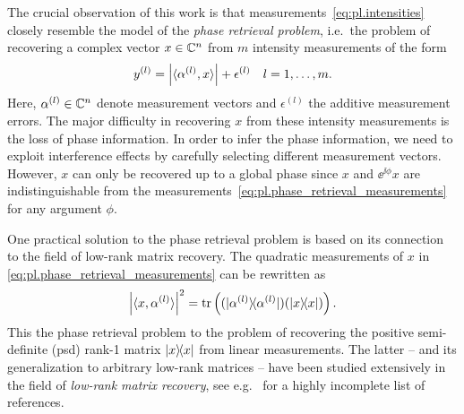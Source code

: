 The crucial observation of this work is that measurements~\eqref{eq:pl.intensities} closely resemble the model of the \textit{phase retrieval problem}, i.e.\ the problem of recovering a complex vector ${x} \in {\mathbb{C}}^n$ from $m$ intensity measurements of the form
\[
  y^{(l)}= {\left\vert\braket{\alpha^{(l)}, x}\right\vert} + \epsilon^{(l)}
  \quad l=1,\ldots,m.
  \label{eq:pl.phase_retrieval_measurements}
\]
Here, $\alpha^{(l)} \in {\mathbb{C}}^n$ denote measurement vectors and $\epsilon^{(l)}$ the additive measurement errors.
The major difficulty in recovering $x$ from these intensity measurements is the loss of phase information.
In order to infer the phase information, we need to exploit interference effects by carefully selecting different measurement vectors.
However, $x$ can only be recovered up to a global phase since $x$ and $\ee^{\ii\phi} x$ are indistinguishable from the measurements~\eqref{eq:pl.phase_retrieval_measurements} for any argument $\phi$.

One practical solution to the phase retrieval problem is based on its connection to the field of low-rank matrix recovery.
The quadratic measurements of $x$ in \cref{eq:pl.phase_retrieval_measurements} can be rewritten as
\[
  \left| \langle {x}, \alpha^{(l)} \rangle \right|^2
  = \tr \left( (\ket{\alpha^{(l)}}\bra{\alpha^{(l)}}) (\ket{{x}}\bra{{x}}) \right).
\]
This  the phase retrieval problem to the problem of recovering the positive semi-definite (psd) rank-1 matrix $\ketbra{x}$ from linear measurements.
The latter -- and its generalization to arbitrary low-rank matrices -- have been studied extensively in the field of \emph{low-rank matrix recovery}, see e.g.~\cite{Ahmed_2014_Blind,Candes_2009_Exact,Candes_2011_Tight,Recht_2010_Guaranteed,Gross_2011_Recovering,Chen_2015_IncoherenceOptimal} for a highly incomplete list of references.

